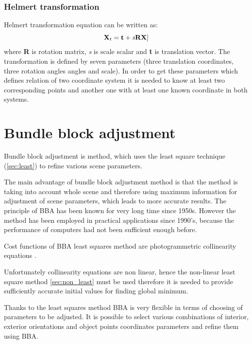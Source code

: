 \documentclass[a4paper,12pt]{report}
\newcommand{\ematr}[1]{
{\bf #1}
}
\newcommand{\evect}[1]{
{\bf #1}
}
\newcommand{\escal}[1]{
{\it #1}
}
\begin{document}
\subsubsection{Helmert transformation}
\label{sec:helmert}

Helmert transformation equation can be written as:
\begin{equation}
\ematr{X}_{t} = \evect{t} + \escal{s}\ematr{R}\evect{X}] \\
\end{equation}
where \ematr{R} is rotation matrix, \escal{s} is scale scalar and  \evect{t} is translation vector.
The transformation is defined by seven parameters (three translation coordinates, three rotation angles angles and scale).
In order to get these parameters which defines relation of two coordinate system it is needed to know at least two corresponding points and  another one with 
at least one known coordinate in both systems. 



\section{Bundle block adjustment}

Bundle block adjustment is method, which uses the least square technique (\ref{sec:least}) to refine  various scene parameters. 

The main advantage of bundle block adjustment method is that the method is taking into account whole scene and therefore using 
maximum information for adjustment of scene parameters, which leads to more accurate results.
The principle of BBA has been known for very long time since 1950s.
However the method has been employed in practical applications since 1990's, because the performance of computers had not been 
sufficient enough before. 

Cost functions of BBA least squares method are photogrammetric collinearity equations \label{eq:p_abbr}.

Unfortunately collinearity equations are non linear, hence the non-linear least square method \ref{sec:non_least} must be used therefore 
it is needed to provide sufficiently accurate initial values for finding global minimum.

Thanks to the least squares method BBA is very flexible in terms of choosing of parameters to be adjusted. 
It is possible to select various combinations of interior, exterior orientations and object points coordinates parameters 
and refine them using BBA. 
\end{document}
